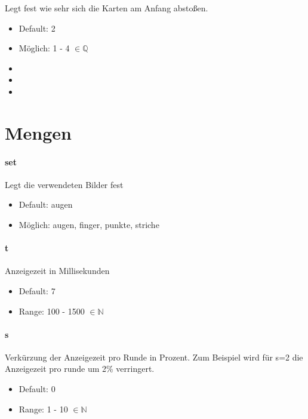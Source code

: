 \documentclass[
  paper=a4,
  ,captions=tableheading
]{scrartcl}
\providecommand{\tightlist}{%
  \setlength{\itemsep}{0pt}\setlength{\parskip}{0pt}}
\begin{document}
Legt fest wie sehr sich die Karten am Anfang abstoßen.

\begin{itemize}
\tightlist
\item
  Default: 2
\item
  Möglich: 1 - 4 \(\in \mathbb{Q}\)

  \item[]
  \item[]
  \item[]
\end{itemize}

\hypertarget{mengen}{%
\section{Mengen}\label{mengen}}

\hypertarget{set}{%
\paragraph{set}\label{set}}

Legt die verwendeten Bilder fest

\begin{itemize}
\tightlist
\item
  Default: augen
\item
  Möglich: augen, finger, punkte, striche
\end{itemize}

\hypertarget{t}{%
\paragraph{t}\label{t}}

Anzeigezeit in Millisekunden

\begin{itemize}
\tightlist
\item
  Default: 7
\item
  Range: 100 - 1500 \(\in \mathbb{N}\)
\end{itemize}

\hypertarget{s}{%
\paragraph{s}\label{s}}

Verkürzung der Anzeigezeit pro Runde in Prozent. Zum Beispiel wird für
s=2 die Anzeigezeit pro runde um 2\% verringert.

\begin{itemize}
\tightlist
\item
  Default: 0
\item
  Range: 1 - 10 \(\in \mathbb{N}\)
\end{itemize}
\end{document}
